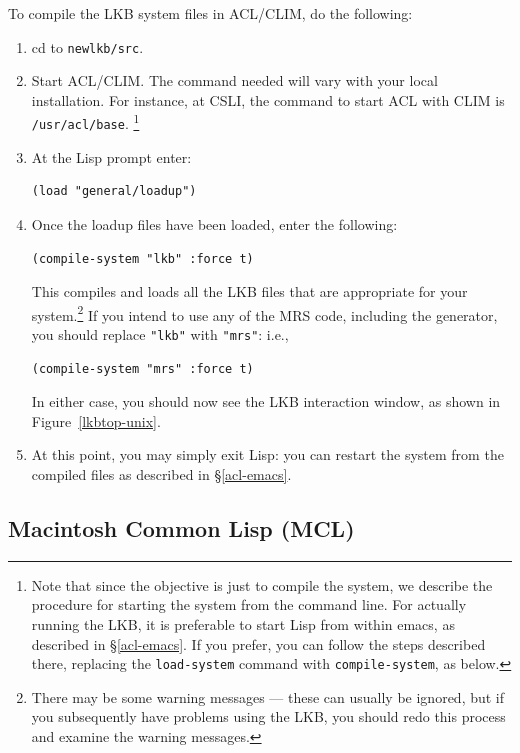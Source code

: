 \documentclass[12pt]{report}
\newcommand{\filename}[1]{{\tt #1}}
\newcommand{\functionname}[1]{{\tt #1}}
\begin{document}
To compile the LKB system files in ACL/CLIM, do the following:
\begin{enumerate}
\item cd to \filename{newlkb/src}.  
\item Start ACL/CLIM.  The command needed will vary with your local
installation.  For instance,
at CSLI, the command to start ACL with CLIM is 
\filename{/usr/acl/base}.
\footnote{Note that since the objective is just to compile the system,
we describe the procedure for
starting the system from the command line.  For actually running the LKB,
it is preferable to start Lisp from within emacs, as described
in \S\ref{acl-emacs}.  If you prefer, you can follow the steps described
there, replacing the \functionname{load-system} command with 
\functionname{compile-system},
as below.}
\item At the Lisp prompt enter:
\begin{verbatim}
(load "general/loadup") 
\end{verbatim}
\item Once the loadup files have been loaded, enter the following:
\begin{verbatim}
(compile-system "lkb" :force t)
\end{verbatim}
This compiles and loads all the LKB files that are appropriate for
your system.\footnote{There may be
some warning messages --- these can usually be ignored, but if you subsequently
have problems using the LKB, you should redo this process
and examine the warning messages.}
If you intend to use any of the MRS code, including the generator,
you should replace \verb+"lkb"+ with \verb+"mrs"+: i.e.,
\begin{verbatim}
(compile-system "mrs" :force t)
\end{verbatim}
In either case, you
should now see the LKB interaction window, as shown in 
Figure~\ref{lkbtop-unix}.
\item At this point, you may simply exit Lisp:
you can restart the system from the compiled files
as described in \S\ref{acl-emacs}.
\end{enumerate}


\subsection{Macintosh Common Lisp (MCL)}
\label{mcl-src}
\end{document}
